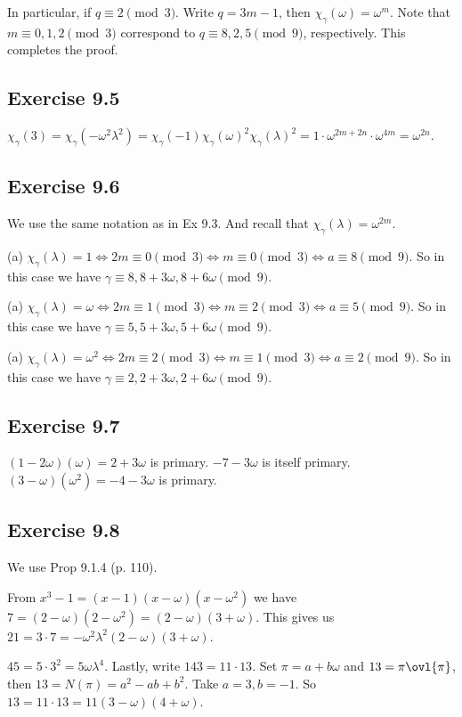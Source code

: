 \documentclass[../Chapter.tex]{subfiles}
\begin{document}
In particular, if $q\equiv2\pmod{3}$. Write $q=3m-1$, then $\chi_\gamma(\omega)=\omega^m$. Note that $m\equiv0,1,2\pmod{3}$ correspond to $q\equiv8,2,5\pmod{9}$, respectively. This completes the proof.

\subsection*{Exercise 9.5}

$\chi_\gamma(3)=\chi_\gamma(-\omega^2\lambda^2)=\chi_\gamma(-1)\chi_\gamma(\omega)^2\chi_\gamma(\lambda)^2=1\cdot\omega^{2m+2n}\cdot\omega^{4m}=\omega^{2n}$.

\subsection*{Exercise 9.6}

We use the same notation as in Ex 9.3. And recall that $\chi_\gamma(\lambda)=\omega^{2m}$.

(a) $\chi_\gamma(\lambda)=1 \iff 2m\equiv0\pmod{3} \iff m\equiv0\pmod{3} \iff a\equiv8\pmod{9}$. So in this case we have $\gamma\equiv8,8+3\omega,8+6\omega\pmod{9}$.

(a) $\chi_\gamma(\lambda)=\omega \iff 2m\equiv1\pmod{3} \iff m\equiv2\pmod{3} \iff a\equiv5\pmod{9}$. So in this case we have $\gamma\equiv5,5+3\omega,5+6\omega\pmod{9}$.

(a) $\chi_\gamma(\lambda)=\omega^2 \iff 2m\equiv2\pmod{3} \iff m\equiv1\pmod{3} \iff a\equiv2\pmod{9}$. So in this case we have $\gamma\equiv2,2+3\omega,2+6\omega\pmod{9}$.

\subsection*{Exercise 9.7}

$(1-2\omega)(\omega)=2+3\omega$ is primary. $-7-3\omega$ is itself primary. $(3-\omega)(\omega^2)=-4-3\omega$ is primary.

\subsection*{Exercise 9.8}

We use Prop 9.1.4 (p. 110).

From $x^3-1=(x-1)(x-\omega)(x-\omega^2)$ we have $7=(2-\omega)(2-\omega^2)=(2-\omega)(3+\omega)$. This gives us $21=3\cdot7=-\omega^2\lambda^2(2-\omega)(3+\omega)$.

$45=5\cdot3^2=5\omega\lambda^4$. Lastly, write $143=11\cdot13$. Set $\pi=a+b\omega$ and $13=\pi\ovl{\pi}$, then $13=N(\pi)=a^2-ab+b^2$. Take $a=3,b=-1$. So $13=11\cdot13=11(3-\omega)(4+\omega)$.
\end{document}
